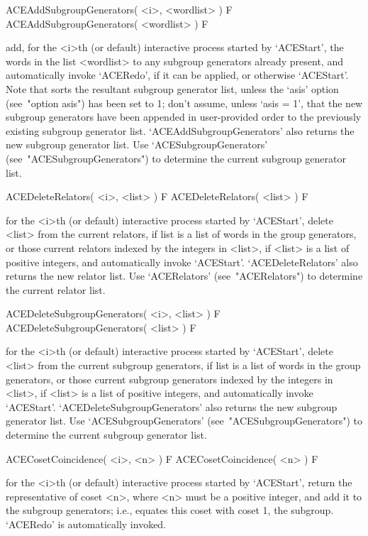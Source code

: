 \>ACEAddSubgroupGenerators( <i>, <wordlist> ) F
\>ACEAddSubgroupGenerators( <wordlist> ) F

add, for the <i>th (or default) interactive {\ACE} process started  by
`ACEStart',  the  words  in  the  list  <wordlist>  to  any   subgroup
generators already present, and automatically invoke `ACERedo', if  it
can be applied, or otherwise `ACEStart'. Note that  {\ACE}  sorts  the
resultant  subgroup  generator  list,   unless   the   `asis'   option
(see~"option asis") has been set to 1; don't assume,  unless  `asis  =
1',  that  the  new  subgroup  generators  have   been   appended   in
user-provided order to  the  previously  existing  subgroup  generator
list.  `ACEAddSubgroupGenerators'  also  returns  the   new   subgroup
generator          list.          Use          `ACESubgroupGenerators'
(see~"ACESubgroupGenerators")  to  determine  the   current   subgroup
generator list.

\>ACEDeleteRelators( <i>, <list> ) F
\>ACEDeleteRelators( <list> ) F

for the <i>th (or  default)  interactive  {\ACE}  process  started  by
`ACEStart', delete <list> from the current relators, if list is a list
of words in the group generators, or those current relators indexed by
the integers in <list>, if <list> is a list of positive integers,  and
automatically invoke `ACEStart'. `ACEDeleteRelators' also returns  the
new relator list. Use `ACERelators' (see~"ACERelators")  to  determine
the current relator list.

\>ACEDeleteSubgroupGenerators( <i>, <list> ) F
\>ACEDeleteSubgroupGenerators( <list> ) F

for the <i>th (or  default)  interactive  {\ACE}  process  started  by
`ACEStart', delete <list> from the  current  subgroup  generators,  if
list is a list of words in the  group  generators,  or  those  current
subgroup generators indexed by the integers in <list>, if <list> is  a
list  of  positive  integers,  and  automatically  invoke  `ACEStart'.
`ACEDeleteSubgroupGenerators' also returns the new subgroup  generator
list.  Use  `ACESubgroupGenerators'  (see~"ACESubgroupGenerators")  to
determine the current subgroup generator list.

\>ACECosetCoincidence( <i>, <n> ) F
\>ACECosetCoincidence( <n> ) F

for the <i>th (or  default)  interactive  {\ACE}  process  started  by
`ACEStart', return the representative of coset <n>, where <n> must  be
a positive integer, and add  it  to  the  subgroup  generators;  i.e.,
equates  this  coset  with  coset  1,  the  subgroup.   `ACERedo'   is
automatically invoked.

